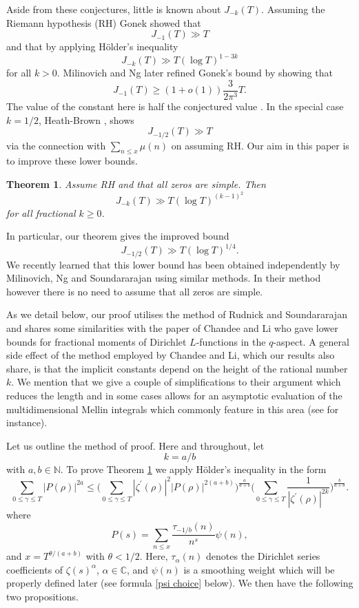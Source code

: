\documentclass[oneside, 12pt]{amsart}
\newtheorem{thm}{Theorem}
\theoremstyle{definition}
\newcommand{\mb}{\mathbb}
\newcommand{\leqs}{\leqslant }
\newcommand{\geqs}{\geqslant }
\begin{document}
Aside from these conjectures, little is known about $J_{-k}(T)$. Assuming the Riemann hypothesis (RH) Gonek \cite{G} showed that 
\[J_{-1}(T)\gg T\]
and that by applying H\"older's inequality
\[J_{-k}(T)\gg T(\log T)^{1-3k}\]
for all $k>0$. Milinovich and Ng \cite{MN} later refined Gonek's bound by showing that 
\[J_{-1}(T)\geqs (1+o(1)) \frac{3}{2\pi^3} T.\] 
The value of the constant here is half the conjectured value \cite{G, HKO}.
In the special case $k=1/2$, Heath-Brown \cite[pg.]{T}, shows
\[
J_{-1/2}(T)\gg T
\] 
via the connection with $\sum_{n\leqs x}\mu(n)$ on assuming RH. Our aim in this paper is to improve these lower bounds. 




\begin{thm}\label{main thm}Assume RH and that all zeros are simple. Then
\begin{equation}
J_{-k}(T)\gg T(\log T)^{(k-1)^2}
\end{equation}
for all fractional $k\geqs 0$.
\end{thm}

In particular, our theorem gives the improved bound
\[
J_{-1/2}(T)\gg T(\log T)^{1/4}.
\]
We recently learned that this lower bound has been obtained independently by Milinovich, Ng and Soundararajan using similar methods. In their method however there is no need to assume that all zeros are simple.

As we detail below, our proof utilises the method of Rudnick and Soundararajan \cite{RS} and shares some similarities with the paper of Chandee and Li \cite{CL} who gave lower bounds for fractional moments of Dirichlet $L$-functions in the $q$-aspect. A general side effect of the method employed by Chandee and Li, which our results also share, is that the implicit constants depend on the height of the rational number $k$. We mention that we give a couple of simplifications to their argument which reduces the length and in some cases allows for an asymptotic evaluation of the multidimensional Mellin integrals which commonly feature in this area (see \cite{KMVK} for instance).



Let us outline the method of proof. Here and throughout, let
\[
k=a/b
\]
with $a,b\in\mathbb{N}$. 
To prove Theorem \ref{main thm} we apply H\"older's inequality in the form 
\begin{equation}\label{holder}
  \sum_{0\leqs \gamma\leqs T} |P(\rho)|^{2a}
  \leqs 
  \Big(\sum_{0\leqs \gamma\leqs T}|\zeta^\prime(\rho)|^2|P(\rho)|^{2(a+b)}\Big)^{\frac{a}{a+b}}
  \Big(\sum_{0\leqs \gamma\leqs T}\frac{1}{|\zeta^\prime(\rho)|^{2k}}\Big)^{\frac{b}{a+b}}.
\end{equation}
where 
\begin{equation}
\label{poly}
P(s)=\sum_{n\leqs x}\frac{\tau_{-1/b}(n)}{n^s}\psi(n),
\end{equation}
and $x=T^{\theta/(a+b)}$ with $\theta<1/2$. Here, $\tau_{\alpha}(n)$ denotes the Dirichlet series coefficients of $\zeta(s)^\alpha$, $\alpha\in\mb{C}$, and $\psi(n)$ is a smoothing weight which will be properly defined later (see formula \eqref{psi choice} below).
 We then have the following two propositions.
\end{document}
